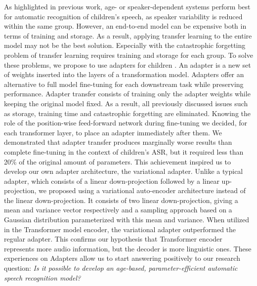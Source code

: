 As highlighted in previous work, age- or speaker-dependent systems perform best for automatic recognition of children's speech, as speaker variability is reduced within the same group. However, an end-to-end model can be expensive both in terms of training and storage. As a result, applying transfer learning to the entire model may not be the best solution. Especially with the catastrophic forgetting problem of transfer learning requires training and storage for each group. To solve these problems, we propose to use adapters for children \cite{houlsby,pfeiffer}. An adapter is a new set of weights inserted into the layers of a transformation model. Adapters offer an alternative to full model fine-tuning for each downstream task while preserving performance. Adapter transfer consists of training only the adapter weights while keeping the original model fixed. As a result, all previously discussed issues such as storage, training time and catastrophic forgetting are eliminated. Knowing the role of the position-wise feed-forward network during fine-tuning we decided, for each transformer layer, to place an adapter immediately after them. We demonstrated that adapter transfer produces marginally worse results than complete fine-tuning in the context of children's ASR, but it required less than 20\% of the original amount of parameters. This achievement inspired us to develop our own adapter architecture, the variational adapter. Unlike a typical adapter, which consists of a linear down-projection followed by a linear up-projection, we proposed using a variational auto-encoder architecture instead of the linear down-projection. It consists of two linear down-projection, giving a mean and variance vector respectively and a sampling approach based on a Gaussian distribution parameterized with this mean and variance. When utilized in the Transformer model encoder, the variational adapter outperformed the regular adapter. This confirms our hypothesis that Transformer encoder represents more audio information, but the decoder is more linguistic ones. These experiences on Adapters allow us to start answering positively to our research question: \textit{Is it possible to develop an age-based, parameter-efficient automatic speech recognition model?}

